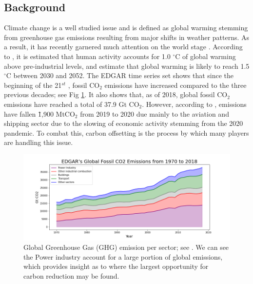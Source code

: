 \documentclass{article}
\begin{document}
\subsection{Background}

Climate change is a well studied issue and is defined as global warming stemming from greenhouse gas emissions resulting from major shifts in weather patterns. As a result, it has recently garnered much attention on the world stage \cite{Kal96,Ten00,Hij05}. According to \cite{Glo21}, it is estimated that human activity accounts for 1.0 $^\circ$C of global warming above pre-industrial levels, and estimate that global warming is likely to reach 1.5$^\circ$C between 2030 and 2052. The EDGAR time series set shows that since the beginning of the 21$^{st}$ \cite{EDGAR19}, fossil CO$_{2}$ emissions have increased compared to the three previous decades; see Fig \ref{fig:edgars_co2_emissions}. It also shows that, as of 2018, global fossil CO$_{2}$ emissions have reached a total of 37.9 Gt CO$_{2}$. However, according to \cite{Liu20}, emissions have fallen \~ 1,900 MtCO$_{2}$ from 2019 to 2020 due mainly to the aviation and shipping sector due to the slowing of economic activity stemming from the 2020 pandemic. To combat this, carbon offsetting is the process by which many players are handling this issue. 

\begin{figure}[h]
\centering
\includegraphics[width=5in]{edgars_co2_emissions.png}
\caption{Global Greenhouse Gas (GHG) emission per sector; see \cite{EDGAR19}. We can see the Power industry account for a large portion of global emissions, which provides insight as to where the largest opportunity for carbon reduction may be found.} 
\label{fig:edgars_co2_emissions}
\end{figure} 
\end{document}
